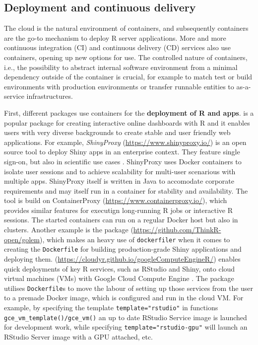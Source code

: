\hypertarget{deployment-and-continuous-delivery}{%
\subsection{Deployment and continuous
delivery}\label{deployment-and-continuous-delivery}}

\label{deployment}

The cloud is the natural environment of containers, and subsequently
containers are the go-to mechanism to deploy R server applications. More
and more continuous integration (CI) and continuous delivery (CD)
services also use containers, opening up new options for use. The
controlled nature of containers, i.e., the possibility to abstract
internal software environment from a minimal dependency outside of the
container is crucial, for example to match test or build environments
with production environments or transfer runnable entities to
as-a-service infrastructures.

First, different packages use containers for the \textbf{deployment of R
and  apps}.  is a popular package for
creating interactive online dashboards with R and it enables users with
very diverse backgrounds to create stable and user friendly web
applications. For example, \emph{ShinyProxy}
(\url{https://www.shinyproxy.io/}) is an open source tool to deploy
Shiny apps in an enterprise context. They feature single sign-on, but
also in scientific use cases
\citep[e.g., ][]{savini_epiexplorer_2019,glouzon_structurexplor_2017}.
ShinyProxy uses Docker containers to isolate user sessions and to
achieve scalability for multi-user scenarious with multiple apps.
ShinyProxy itself is written in Java to accomodate corporate
requirements and may itself run in a container for stability and
availability. The tool is build on ContainerProxy
(\url{https://www.containerproxy.io/}), which provides similar features
for executign long-running R jobs or interactive R sessions. The started
containers can run on a regular Docker host but also in clusters.
Another example is the package 
(\url{https://github.com/ThinkR-open/golem}), which makes an heavy use
of \texttt{dockerfiler} when it comes to creating the
\texttt{Dockerfile} for building production-grade Shiny applications and
deploying them. 
(\url{https://cloudyr.github.io/googleComputeEngineR/}) enables quick
deployments of key R services, such as RStudio and Shiny, onto cloud
virtual machines (VMs) with Google Cloud Compute Engine
\citep{googleComputeEngineR_2019}. The package utilises
\texttt{Dockerfile}s to move the labour of setting up those services
from the user to a premade Docker image, which is configured and run in
the cloud VM. For example, by specifying the template
\texttt{template="rstudio"} in functions
\texttt{gce\_vm\_template()/gce\_vm()} an up to date RStudio Service
image is launched for development work, while specifying
\texttt{template="rstudio-gpu"} will launch an RStudio Server image with
a GPU attached, etc.

